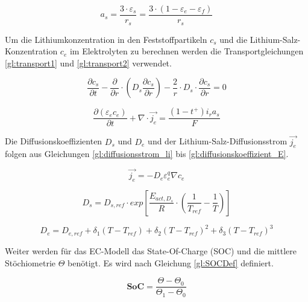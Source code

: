 \begin{equation}
	a_{s} = \frac{3\cdot \varepsilon_{s}}{r_{s}} = \frac{3 \cdot (1 - \varepsilon_{e} - \varepsilon_{f})}{r_{s}} \label{gl:surfacepervolume}
\end{equation}

Um die Lithiumkonzentration in den Feststoffpartikeln $c_{s}$ und die Lithium-Salz-Konzentration $c_{e}$ im Elektrolyten zu berechnen werden die Transportgleichungen \ref{gl:transport1} und \ref{gl:transport2} verwendet.

\begin{equation}
	\frac{\partial c_{s}}{\partial t} - \frac{\partial}{\partial r}\cdot \left( D_{s} \frac{\partial c_{s}}{\partial r} \right) - \frac{2}{r} \cdot D_{s} \cdot \frac{\partial c_{s}}{\partial r} = 0 \label{gl:transport1}
\end{equation}

\begin{equation}
	\frac{\partial (\varepsilon_{e}c_{e})}{\partial t} + \nabla \cdot \vec{j_{e}} = \frac{(1-t^{+}) i_{r} a_{s}}{F} \label{gl:transport2}
\end{equation}

Die Diffusionskoeffizienten $D_{s}$ und $D_{e}$ und der Lithium-Salz-Diffusionsstrom $\vec{j_{e}}$ folgen aus Gleichungen \ref{gl:diffusionsstrom_li} bis \ref{gl:diffusionskoeffizient_E}.

\begin{equation}
	\vec{j_{e}} = -D_{e} \varepsilon^{q}_{e} \nabla c_{e} \label{gl:diffusionsstrom_li}
\end{equation}

\begin{equation}
	D_{s} = D_{s,ref} \cdot exp \left[ \frac{E_{act,D_{s}}}{R} \cdot \left( \frac{1}{T_{ref}} - \frac{1}{T} \right) \right] \label{gl:diffusionskoeffizient_S}
\end{equation}

\begin{equation}
	D_{e} = D_{e,ref} + \delta_{1} (T- T_{ref}) + \delta_{2} (T- T_{ref})^{2} + \delta_{3} (T-T_{ref})^{3} \label{gl:diffusionskoeffizient_E}
\end{equation}

Weiter werden für das EC-Modell das State-Of-Charge (SOC) und die mittlere Stöchiometrie $\Theta$ benötigt. Es wird nach Gleichung \ref{gl:SOCDef} definiert. 

\begin{equation}
	\mathbf{SoC} = \frac{\Theta - \Theta_{0}}{\Theta_{1} - \Theta_{0}} \label{gl:SOCDef}
\end{equation}

